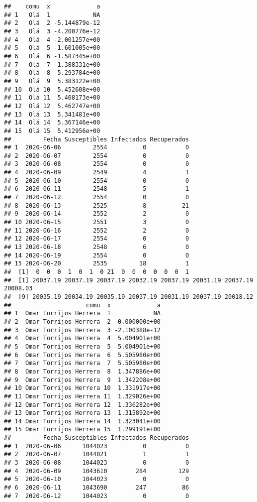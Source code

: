 \documentclass[
]{article}
\begin{document}
\begin{verbatim}
##    comu  x             a
## 1   Olá  1            NA
## 2   Olá  2 -5.144879e-12
## 3   Olá  3 -4.200776e-12
## 4   Olá  4 -2.001257e+00
## 5   Olá  5 -1.601005e+00
## 6   Olá  6 -1.587345e+00
## 7   Olá  7 -1.388331e+00
## 8   Olá  8  5.293784e+00
## 9   Olá  9  5.383122e+00
## 10  Olá 10  5.452608e+00
## 11  Olá 11  5.408173e+00
## 12  Olá 12  5.462747e+00
## 13  Olá 13  5.341481e+00
## 14  Olá 14  5.367146e+00
## 15  Olá 15  5.412956e+00
##         Fecha Susceptibles Infectados Recuperados
## 1  2020-06-06         2554          0           0
## 2  2020-06-07         2554          0           0
## 3  2020-06-08         2554          0           0
## 4  2020-06-09         2549          4           1
## 5  2020-06-10         2554          0           0
## 6  2020-06-11         2548          5           1
## 7  2020-06-12         2554          0           0
## 8  2020-06-13         2525          8          21
## 9  2020-06-14         2552          2           0
## 10 2020-06-15         2551          3           0
## 11 2020-06-16         2552          2           0
## 12 2020-06-17         2554          0           0
## 13 2020-06-18         2548          6           0
## 14 2020-06-19         2554          0           0
## 15 2020-06-20         2535         18           1
##  [1]  0  0  0  1  0  1  0 21  0  0  0  0  0  0  1
##  [1] 20037.19 20037.19 20037.19 20032.19 20037.19 20031.19 20037.19 20008.03
##  [9] 20035.19 20034.19 20035.19 20037.19 20031.19 20037.19 20018.12
##                     comu  x             a
## 1  Omar Torrijos Herrera  1            NA
## 2  Omar Torrijos Herrera  2  0.000000e+00
## 3  Omar Torrijos Herrera  3 -2.100388e-12
## 4  Omar Torrijos Herrera  4  5.004901e+00
## 5  Omar Torrijos Herrera  5  5.004901e+00
## 6  Omar Torrijos Herrera  6  5.505980e+00
## 7  Omar Torrijos Herrera  7  5.505980e+00
## 8  Omar Torrijos Herrera  8  1.347886e+00
## 9  Omar Torrijos Herrera  9  1.342208e+00
## 10 Omar Torrijos Herrera 10  1.331917e+00
## 11 Omar Torrijos Herrera 11  1.329026e+00
## 12 Omar Torrijos Herrera 12  1.336282e+00
## 13 Omar Torrijos Herrera 13  1.315892e+00
## 14 Omar Torrijos Herrera 14  1.323041e+00
## 15 Omar Torrijos Herrera 15  1.299191e+00
##         Fecha Susceptibles Infectados Recuperados
## 1  2020-06-06      1044023          0           0
## 2  2020-06-07      1044021          1           1
## 3  2020-06-08      1044023          0           0
## 4  2020-06-09      1043610        284         129
## 5  2020-06-10      1044023          0           0
## 6  2020-06-11      1043690        247          86
## 7  2020-06-12      1044023          0           0

\end{verbatim}
\end{document}
